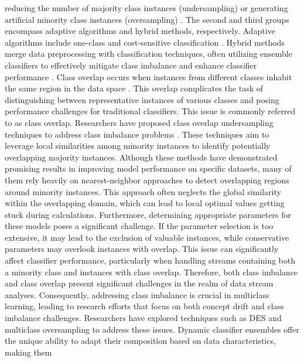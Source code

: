   reducing the number of majority class instances (undersampling) or generating artificial minority class instances (oversampling)
  \cite{liu2018making}\cite{japkowicz1995novelty}\cite{lopez2012analysis}. The second and third groups encompass adaptive algorithms and hybrid methods, respectively. Adaptive algorithms include
  one-class and cost-sensitive classification \cite{zhang2020towards}. Hybrid methods merge data preprocessing with classification techniques, often utilizing ensemble classifiers to effectively mitigate class imbalance and enhance classifier performance \cite{chawla2003smoteboost}\cite{wang2010negative}\cite{bhowan2012evolving}.
  Class overlap occurs when instances from different classes inhabit the same region in the data space \cite{galar2011review}\cite{cruz2018dynamic}. This overlap complicates the task of distinguishing between representative instances of various classes and posing performance challenges for traditional classifiers. This issue is commonly referred to as class overlap. Researchers have proposed class overlap undersampling
  techniques to address class imbalance problems \cite{kuncheva2000clustering}. These techniques aim to leverage local similarities among minority instances to
  identify potentially overlapping majority instances. Although these methods have demonstrated promising results in improving model
  performance on specific datasets, many of them rely heavily on nearest-neighbor approaches to detect overlapping regions around
  minority instances. This approach often neglects the global similarity within the overlapping domain, which can lead to local optimal
  values getting stuck during calculations. Furthermore, determining appropriate parameters for these models poses a significant
  challenge. If the parameter selection is too extensive, it may lead to the exclusion of valuable instances, while conservative parameters
  may overlook instances with overlap. This issue can significantly affect classifier performance, particularly when handling streams
  containing both a minority class and instances with class overlap. Therefore, both class imbalance and class overlap present significant
  challenges in the realm of data stream analyses. Consequently, addressing class imbalance is crucial in multiclass learning, leading to
  research efforts that focus on both concept drift and class imbalance challenges. Researchers have explored techniques such as DES and
  multiclass oversampling to address these issues.
  Dynamic classifier ensembles offer the unique ability to adapt their composition based on data characteristics, making them
